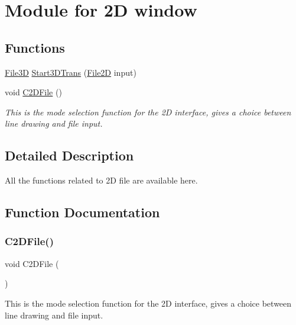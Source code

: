 \hypertarget{group___module}{}\section{Module for 2D window}
\label{group___module}
\subsection*{Functions}
\begin{DoxyCompactItemize}
\item 
\mbox{\hyperlink{class_file3_d}{File3D}} \mbox{\hyperlink{group___module_gad99a14e6347dc60d82d1132bbdd5570b}{Start3\+D\+Trans}} (\mbox{\hyperlink{class_file2_d}{File2D}} input)
\item 
void \mbox{\hyperlink{group___module_ga18ff2f0b89369cc9c7e010202d109cac}{C2\+D\+File}} ()
\begin{DoxyCompactList}\small\item\em This is the mode selection function for the 2D interface, gives a choice between line drawing and file input. \end{DoxyCompactList}\end{DoxyCompactItemize}


\subsection{Detailed Description}
All the functions related to 2D file are available here. 

\subsection{Function Documentation}
\mbox{\label{group___module_ga18ff2f0b89369cc9c7e010202d109cac}} 
\subsubsection{\texorpdfstring{C2\+D\+File()}{C2DFile()}}
{\footnotesize\ttfamily void C2\+D\+File (\begin{DoxyParamCaption}{ }\end{DoxyParamCaption})}



This is the mode selection function for the 2D interface, gives a choice between line drawing and file input. 

